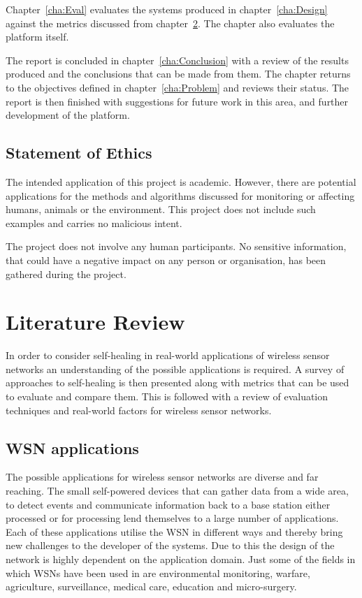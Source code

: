 \documentclass[authoryearcitations]{UoYCSproject}
\begin{document}
Chapter~\ref{cha:Eval} evaluates the systems produced in chapter~\ref{cha:Design} against the metrics discussed from chapter~\ref{cha:LitReview}. The chapter also evaluates the platform itself.

The report is concluded in chapter~\ref{cha:Conclusion} with a review of the results produced and the conclusions that can be made from them. The chapter returns to the objectives defined in chapter~\ref{cha:Problem} and reviews their status. The report is then finished with suggestions for future work in this area, and further development of the platform.

\section{Statement of Ethics}

The intended application of this project is academic. However, there are potential applications for the methods and algorithms discussed for monitoring or affecting humans, animals or the environment. This project does not include such examples and carries no malicious intent.

The project does not involve any human participants. No sensitive information, that could have a negative impact on any person or organisation, has been gathered during the project.

\chapter{Literature Review}
\label{cha:LitReview}


In order to consider self-healing in real-world applications of wireless sensor networks an understanding of the possible applications is required. A survey of approaches to self-healing is then presented along with metrics that can be used to evaluate and compare them. This is followed with a review of evaluation techniques and real-world factors for wireless sensor networks.

\section{WSN applications}


The possible applications for wireless sensor networks are diverse and far reaching. The small self-powered devices that can gather data from a wide area, to detect events and communicate information back to a base station either processed or for processing lend themselves to a large number of applications. Each of these applications utilise the WSN in different ways and thereby bring new challenges to the developer of the systems. Due to this the design of the network is highly dependent on the application domain. Just some of the fields in which WSNs have been used in are environmental monitoring, warfare, agriculture, surveillance, medical care, education and micro-surgery.
\end{document}
